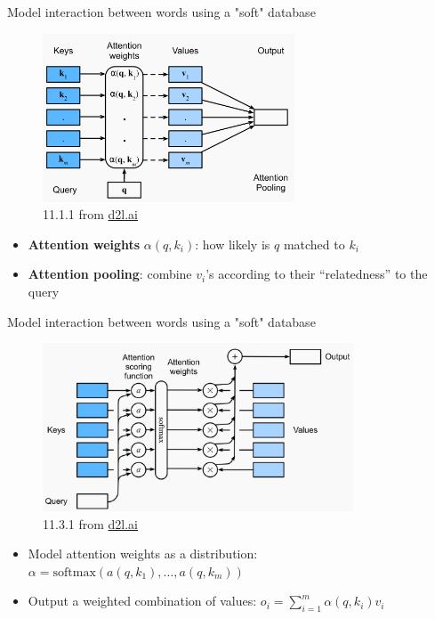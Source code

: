 \documentclass[usenames,dvipsnames,notes,11pt,aspectratio=169,hyperref={colorlinks=true, linkcolor=blue}]{beamer}
\begin{document}
\begin{frame}
    {Model interaction between words using a "soft" database}
    \begin{figure}
        \includegraphics[height=5cm]{figures/qkv}
        \caption{11.1.1 from \href{https://d2l.ai/chapter_attention-mechanisms-and-transformers/queries-keys-values.html}{d2l.ai}}
    \end{figure}
    \vspace{-1em}
    \begin{itemize}
        \item \textbf{Attention weights} $\alpha(q, k_i)$: how likely is $q$ matched to $k_i$
        \item \textbf{Attention pooling}: combine $v_i$'s according to their ``relatedness'' to the query
    \end{itemize}
\end{frame}

\begin{frame}
    {Model interaction between words using a "soft" database}
    \begin{figure}
        \includegraphics[height=5cm]{figures/qkv-2}
        \caption{11.3.1 from \href{https://d2l.ai/chapter_attention-mechanisms-and-transformers/attention-scoring-functions.html}{d2l.ai}}
    \end{figure}
    \vspace{-1em}
    \begin{itemize}
        \item Model {attention weights} as a distribution: $\alpha=\mathrm{softmax}(a(q,k_1),\ldots,a(q,k_m))$
        \item Output a weighted combination of values: $o_i = \sum_{i=1}^m \alpha(q,k_i) v_i$
    \end{itemize}
\end{frame}
\end{document}

